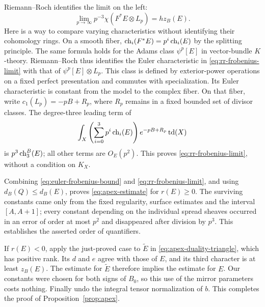 Riemann--Roch identifies the limit on the left:
\begin{equation}\label{eq:rr-frobenius-limit}
 \lim_{p\to\infty}p^{-3}\chi(F^*E\otimes L_p)=h z_B(E).
\end{equation}
Here is a way to compare varying characteristics without
identifying their cohomology rings.  On a smooth fiber,
$\operatorname{ch}_i(F^*E)=p^i\operatorname{ch}_i(E)$ by the splitting principle.  The same
formula holds for the Adams class $\psi^p[E]$ in vector-bundle
$K$-theory.  Riemann--Roch thus identifies the Euler characteristic
in \eqref{eq:rr-frobenius-limit} with that of
$\psi^p[E]\otimes L_p$.  This class is defined by exterior-power
operations on a fixed perfect presentation and commutes with
specialization.  Its Euler characteristic is constant from the
model to the complex fiber.  On that fiber, write
$c_1(L_p)=-pB+R_p$, where $R_p$ remains in a fixed bounded set of
divisor classes.  The degree-three leading term of
\[
 \int_X\left(\sum_{i=0}^3p^i\operatorname{ch}_i(E)\right)
                  e^{-pB+R_p}\operatorname{td}(X)
\]
is $p^3\operatorname{ch}_3^B(E)$; all other terms are $O_E(p^2)$.
This proves \eqref{eq:rr-frobenius-limit}, without a condition on
$K_X$.

Combining \eqref{eq:euler-frobenius-bound} and
\eqref{eq:rr-frobenius-limit}, and using $d_B(Q)\leq d_B(E)$,
proves \eqref{eq:apex-estimate} for $r(E)\geq0$.
The surviving constants came only from the fixed regularity,
surface estimates and the interval $[A,A+1]$; every constant
depending on the individual spread sheaves occurred in an error
of order at most $p^2$ and disappeared after division by $p^3$.
This establishes the asserted order of quantifiers.

If $r(E)<0$, apply the just-proved case to $\widetilde E$ in
\eqref{eq:apex-duality-triangle}, which has positive rank.
Its $d$ and $e$ agree with those of $E$, and its third character
is at least $z_B(E)$.  The estimate for $\widetilde E$ therefore
implies the estimate for $E$.  Our constants were chosen for both
signs of $B_0$, so this use of the mirror parameters costs nothing.
Finally undo the integral tensor normalization of $b$.
This completes the proof of Proposition~\ref{prop:apex}.
